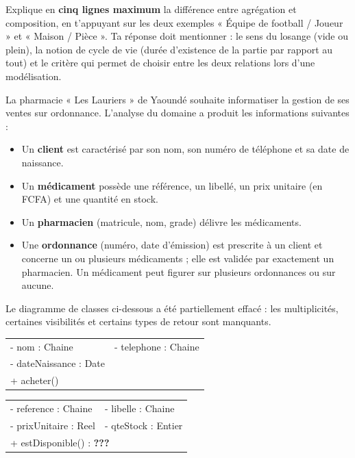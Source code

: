 \documentclass[11pt]{article}
\newcounter{popsec}
\newcounter{popsub}
\newcommand{\courssub}[1]{%
  \stepcounter{popsub}%
  \par\vspace{9pt}\noindent{\popxbold\fontsize{11.5}{13}\selectfont\color{popink}{\color{poporange}\thepopsec.\thepopsub}\hspace{6pt}#1}\par\nopagebreak\vspace{4pt}
}
\begin{document}
\begin{exercice}
Explique en \textbf{cinq lignes maximum} la différence entre agrégation et composition, en t'appuyant sur les deux exemples « Équipe de football / Joueur » et « Maison / Pièce ». Ta réponse doit mentionner : le sens du losange (vide ou plein), la notion de cycle de vie (durée d'existence de la partie par rapport au tout) et le critère qui permet de choisir entre les deux relations lors d'une modélisation.
\end{exercice}

\courssub{Je me prépare au Bac}

\begin{exercice}
La pharmacie « Les Lauriers » de Yaoundé souhaite informatiser la gestion de ses ventes sur ordonnance. L'analyse du domaine a produit les informations suivantes :
\begin{itemize}
  \item Un \textbf{client} est caractérisé par son nom, son numéro de téléphone et sa date de naissance.
  \item Un \textbf{médicament} possède une référence, un libellé, un prix unitaire (en FCFA) et une quantité en stock.
  \item Un \textbf{pharmacien} (matricule, nom, grade) délivre les médicaments.
  \item Une \textbf{ordonnance} (numéro, date d'émission) est prescrite à un client et concerne un ou plusieurs médicaments ; elle est validée par exactement un pharmacien. Un médicament peut figurer sur plusieurs ordonnances ou sur aucune.
\end{itemize}
Le diagramme de classes ci-dessous a été partiellement effacé : les multiplicités, certaines visibilités et certains types de retour sont manquants.

\begin{center}
\begin{tabularx}{\linewidth}{|X|X|}
\hline
\rowcolor{popblueL}\multicolumn{2}{|l|}{\textbf{Client}}\\
\hline
- nom : Chaine & - telephone : Chaine\\
- dateNaissance : Date & \\
\hline
\multicolumn{2}{|l|}{+ acheter()}\\
\hline
\end{tabularx}

\vspace{0.4em}
\begin{tabularx}{\linewidth}{|X|X|}
\hline
\rowcolor{popblueL}\multicolumn{2}{|l|}{\textbf{Medicament}}\\
\hline
- reference : Chaine & - libelle : Chaine\\
- prixUnitaire : Reel & - qteStock : Entier\\
\hline
\multicolumn{2}{|l|}{+ estDisponible() : \textbf{???}}\\
\hline
\end{tabularx}


\end{center}
\end{exercice}
\end{document}
